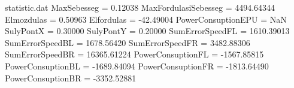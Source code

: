 \begin{filecontents*}{statistic.dat}
MaxSebesseg =    0.12038
MaxFordulasiSebesseg = 4494.64344
Elmozdulas =    0.50963
Elfordulas =  -42.49004
PowerConsuptionEPU =        NaN
SulyPontX =    0.30000
SulyPontY =    0.20000
SumErrorSpeedFL = 1610.39013
SumErrorSpeedBL = 1678.56420
SumErrorSpeedFR = 3482.88306
SumErrorSpeedBR = 16365.61224
PowerConsuptionFL = -1567.85815
PowerConsuptionBL = -1689.84094
PowerConsuptionFR = -1813.64490
PowerConsuptionBR = -3352.52881
\end{filecontents*}
